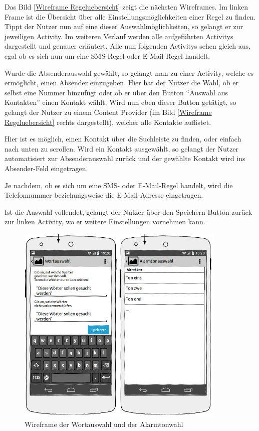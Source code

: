 Das Bild \ref{Wireframe Regeluebersicht} zeigt die n\"achsten Wireframes. Im linken Frame ist die \"Ubersicht \"uber alle Einstellungsm\"oglichkeiten einer Regel zu finden. Tippt der Nutzer nun auf eine dieser Auswahlm\"oglichkeiten, so gelangt er zur jeweiligen Activity. Im weiteren Verlauf werden alle aufgef\"uhrten Activitys dargestellt und genauer erl\"autert.
Alle nun folgenden Activitys sehen gleich aus, egal ob es sich nun um eine SMS-Regel oder E-Mail-Regel handelt.

Wurde die Absenderauswahl gew\"ahlt, so gelangt man zu einer Activity, welche es erm\"oglicht, einen Absender einzugeben. Hier hat der Nutzer die Wahl, ob er selbst eine Nummer hinzuf\"ugt oder ob er \"uber den Button "`Auswahl aus Kontakten"' einen Kontakt w\"ahlt. Wird nun eben dieser Button get\"atigt, so gelangt der Nutzer zu einem Content Provider (im Bild \ref{Wireframe Regeluebersicht} rechts dargestellt), welcher alle Kontakte auflistet. 

Hier ist es m\"oglich, einen Kontakt \"uber die Suchleiste zu finden, oder einfach nach unten zu scrollen. Wird ein Kontakt ausgew\"ahlt, so gelangt der Nutzer automatisiert zur Absenderauswahl zur\"uck und der gew\"ahlte Kontakt wird ins Absender-Feld eingetragen.

Je nachdem, ob es sich um eine SMS- oder E-Mail-Regel handelt, wird die Telefonnummer beziehungsweise die E-Mail-Adresse eingetragen.

Ist die Auswahl vollendet, gelangt der Nutzer \"uber den Speichern-Button zur\"uck zur linken Activity, wo er weitere Einstellungen vornehmen kann.
 
\begin{figure}[!ht]
\centering
\includegraphics[width=10cm]{Bilder/WireframeWortwahl.png}
\caption{Wireframe der Wortauswahl und der Alarmtonwahl}
\label{Wireframe Wortauswahl}
\centering
\end{figure}

